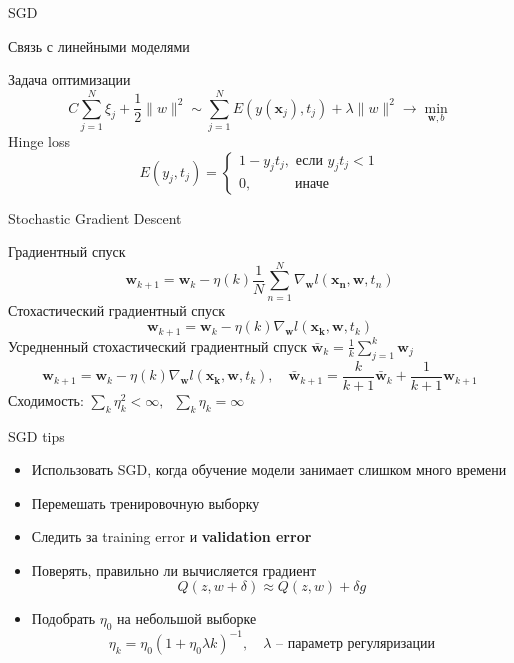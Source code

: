 \documentclass[10pt]{beamer}
\begin{document}
\begin{frame}{}

\begin{center}
\Large SGD
\end{center}

\end{frame}

\begin{frame}{Связь с линейными моделями}

Задача оптимизации 
\[
C \sum_{j=1}^N \xi_j + \frac{1}{2} \|w\|^2 \sim \sum_{j=1}^N E(y(\mathbf{x}_j), t_j) + \lambda \|w\|^2 \rightarrow \min_{\mathbf{w}, b}
\]
Hinge loss
\[
E(y_j, t_j) = \begin{cases}
1 - y_j t_j, \text{ если } y_j t_j < 1 \\
0, \quad\quad\;\;\,\text{ иначе }
\end{cases}
\]

\end{frame}

\begin{frame}{Stochastic Gradient Descent}

Градиентный спуск
\[
\mathbf{w}_{k+1} = \mathbf{w}_k - \eta(k) \frac 1 N \sum_{n=1}^N \nabla_\mathbf{w} l(\mathbf{x_n, \mathbf{w}}, t_n)
\]
Стохастический градиентный спуск
\[
\mathbf{w}_{k+1} = \mathbf{w}_k - \eta(k) \nabla_\mathbf{w} l(\mathbf{x_k, \mathbf{w}}, t_k)
\]
Усредненный стохастический градиентный спуск $\bar{\mathbf{w}}_k = \frac 1 k \sum_{j=1}^k \mathbf{w}_j$
\[
\mathbf{w}_{k+1} = \mathbf{w}_k - \eta(k) \nabla_\mathbf{w} l(\mathbf{x_k, \mathbf{w}}, t_k), \quad \bar{\mathbf{w}}_{k+1} = \frac{k}{k+1} \bar{\mathbf{w}}_{k} + \frac{1}{k+1} \mathbf{w}_{k+1}
\]
Сходимость: $\sum_k \eta_k^2 < \infty, \;\; \sum_k \eta_k = \infty$

\end{frame}

\begin{frame}{SGD tips}

\begin{itemize}
\item Использовать SGD, когда обучение модели занимает слишком много времени
\item Перемешать тренировочную выборку
\item Следить за training error и {\bf validation error}
\item Поверять, правильно ли вычисляется градиент 
\[
Q(z, w + \delta) \approx Q(z, w) + \delta g
\]
\item Подобрать $\eta_0$ на небольшой выборке 
\[
\eta_k = \eta_0 (1 + \eta_0 \lambda k)^{-1}, \quad \lambda\text{ -- параметр регуляризации}
\] 
\end{itemize}

\end{frame}
\end{document}
